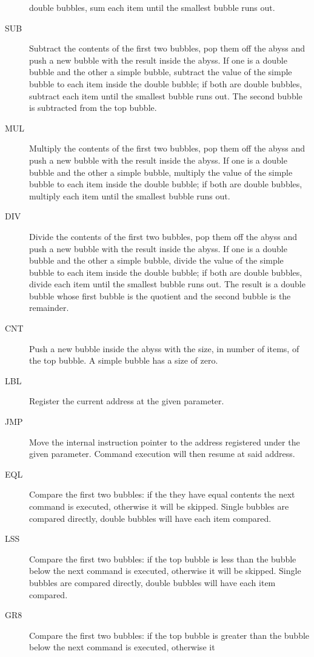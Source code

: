\documentclass[11pt,a4paper,draft]{book}
\begin{document}
\begin{description}
  double bubbles, sum each item until the smallest bubble runs out.
\item[SUB] Subtract the contents of the first two bubbles, pop them
  off the abyss and push a new bubble with the result inside the
  abyss. If one is a double bubble and the other a simple bubble,
  subtract the value of the simple bubble to each item inside the
  double bubble; if both are double bubbles, subtract each item until
  the smallest bubble runs out. The second bubble is subtracted from
  the top bubble.
\item[MUL] Multiply the contents of the first two bubbles, pop them
  off the abyss and push a new bubble with the result inside the
  abyss. If one is a double bubble and the other a simple bubble,
  multiply the value of the simple bubble to each item inside the
  double bubble; if both are double bubbles, multiply each item until
  the smallest bubble runs out.
\item[DIV] Divide the contents of the first two bubbles, pop them off
  the abyss and push a new bubble with the result inside the abyss. If
  one is a double bubble and the other a simple bubble, divide the
  value of the simple bubble to each item inside the double bubble; if
  both are double bubbles, divide each item until the smallest bubble
  runs out. The result is a double bubble whose first bubble is the
  quotient and the second bubble is the remainder.
\item[CNT] Push a new bubble inside the abyss with the size, in number
  of items, of the top bubble. A simple bubble has a size of zero.
\item[LBL] Register the current address at the given parameter.
\item[JMP] Move the internal instruction pointer to the address
  registered under the given parameter. Command execution will then
  resume at said address.
\item[EQL] Compare the first two bubbles: if the they have equal
  contents the next command is executed, otherwise it will be
  skipped. Single bubbles are compared directly, double bubbles will
  have each item compared.
\item[LSS] Compare the first two bubbles: if the top bubble is less
  than the bubble below the next command is executed, otherwise it
  will be skipped. Single bubbles are compared directly, double
  bubbles will have each item compared.
\item[GR8] Compare the first two bubbles: if the top bubble is greater
  than the bubble below the next command is executed, otherwise it

\end{description}
\end{document}

